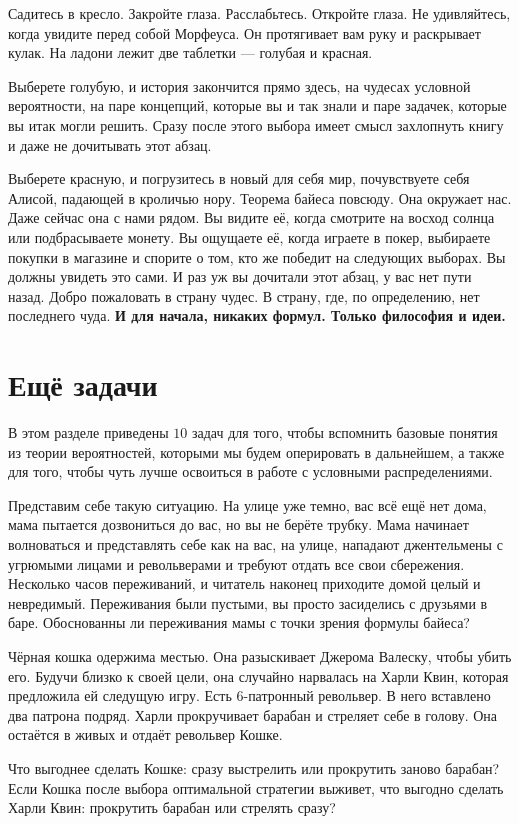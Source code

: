 Садитесь в кресло. Закройте глаза. Расслабьтесь. Откройте глаза. Не удивляйтесь, когда увидите перед собой Морфеуса. Он протягивает вам руку и раскрывает кулак. На ладони лежит две таблетки --- голубая и красная. 

Выберете голубую, и история закончится прямо здесь, на чудесах условной вероятности, на паре концепций, которые вы и так знали и паре задачек, которые вы итак могли решить. Сразу после этого выбора имеет смысл захлопнуть книгу и даже не дочитывать этот абзац. 

Выберете красную, и погрузитесь в новый для себя мир, почувствуете себя Алисой, падающей в кроличью нору. Теорема байеса повсюду. Она окружает нас. Даже сейчас она с нами рядом. Вы видите её, когда смотрите на восход солнца или подбрасываете монету. Вы ощущаете её, когда играете в покер, выбираете покупки в магазине и спорите о том, кто же победит на следующих выборах. Вы должны увидеть это сами. И раз уж вы дочитали этот абзац, у вас нет пути назад. Добро пожаловать в страну чудес. В страну, где, по определению, нет последнего чуда. \textbf{И для начала, никаких формул. Только философия и идеи.}


\section{Ещё задачи} 

В этом разделе приведены $10$ задач для того, чтобы вспомнить базовые понятия из теории вероятностей, которыми мы будем оперировать в дальнейшем, а также для того, чтобы чуть лучше освоиться в работе с условными распределениями. 

\begin{problem}
Представим себе такую ситуацию. На улице уже темно, вас всё ещё нет дома, мама пытается дозвониться до вас, но вы не берёте трубку.  Мама начинает волноваться и представлять себе как на вас, на улице, нападают джентельмены с угрюмыми лицами и револьверами и требуют отдать все свои сбережения.  Несколько часов переживаний, и читатель наконец приходите домой целый и невредимый. Переживания были пустыми, вы просто засиделись с друзьями в баре.  Обоснованны ли переживания мамы с точки зрения формулы байеса? 
\end{problem}


\begin{problem}
Чёрная кошка одержима местью. Она разыскивает Джерома Валеску, чтобы убить его. Будучи близко к своей цели, она случайно нарвалась на Харли Квин, которая предложила ей следущую игру. Есть 6-патронный  револьвер. В него вставлено два патрона подряд. Харли прокручивает барабан и стреляет себе в голову. Она остаётся в живых и отдаёт револьвер Кошке. 

Что выгоднее сделать Кошке: сразу выстрелить или прокрутить заново барабан? Если Кошка после выбора оптимальной стратегии выживет, что выгодно сделать Харли Квин: прокрутить барабан или стрелять сразу?
\end{problem}

